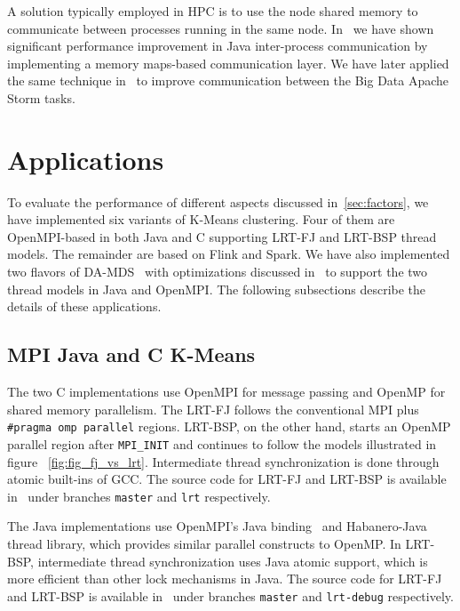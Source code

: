 \documentclass[10pt, conference, compsocconf]{IEEEtran}
\begin{document}
A solution typically employed in \ac{HPC} is to use the node shared memory to communicate between processes running in the same node. In~\cite{hpc2016:spidaljava} we have shown significant performance improvement in Java inter-process communication by implementing a memory maps-based communication layer. We have later applied the same technique in~\cite{kamburugamuve2016towards} to improve communication between the Big Data Apache Storm tasks.

\section{Applications} \label{sec:applications}
To evaluate the performance of different aspects discussed in~\ref{sec:factors}, we have implemented six variants of K-Means clustering. Four of them are OpenMPI-based in both Java and C supporting \ac{LRT-FJ} and \ac{LRT-BSP} thread models. The remainder are based on Flink and Spark. We have also implemented two flavors of \ac{DA-MDS}~\cite{Ruan:2013:RSS:2547685.2547700} with optimizations discussed in~\cite{hpc2016:spidaljava} to support the two thread models in Java and OpenMPI. The following subsections describe the details of these applications.

\subsection{\ac{MPI} Java and C K-Means}
The two C implementations use OpenMPI for message passing and OpenMP for shared memory parallelism. The \ac{LRT-FJ} follows the conventional \ac{MPI} plus \texttt{\#pragma omp parallel} regions. \ac{LRT-BSP}, on the other hand, starts an OpenMP parallel region after \texttt{MPI\_INIT} and continues to follow the models illustrated in figure ~\ref{fig:fig_fj_vs_lrt}. Intermediate thread synchronization is done through atomic built-ins of \ac{GCC}. The source code for \ac{LRT-FJ} and \ac{LRT-BSP} is available in~\cite{mpi-c-kmeans} under branches \texttt{master} and \texttt{lrt} respectively.

The Java implementations use OpenMPI's Java binding~\cite{Vega-Gisbert:2013:TAJ:2488551.2488599,ompi-java-impl} and Habanero-Java~\cite{Imam:2014:HLJ:2647508.2647514} thread library, which provides similar parallel constructs to OpenMP. In \ac{LRT-BSP}, intermediate thread synchronization uses Java atomic support, which is more efficient than other lock mechanisms in Java. The source code for \ac{LRT-FJ} and \ac{LRT-BSP} is available in~\cite{mpi-java-kmeans} under branches \texttt{master} and \texttt{lrt-debug} respectively.
\end{document}
